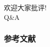 \documentclass{beamer}
\begin{document}
\begin{frame}
	\begin{center}
 		\huge {欢迎大家批评!}\\
		\vspace{1cm}
		\huge {Q\&A}
	\end{center}
\end{frame}

\begin{frame}[allowframebreaks] %
   \frametitle{参考文献}
\tiny


\end{frame}
\end{document}
